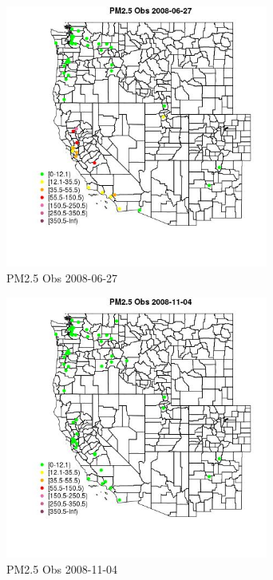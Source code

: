 \begin{figure} 
\centering  
\includegraphics[width=0.77\textwidth]{Code_Outputs/Report_ML_input_PM25_Step4_part_e_de_duplicated_aves_MapObsPM25_Obs2008-06-27.jpg} 
\caption{\label{fig:Report_ML_input_PM25_Step4_part_e_de_duplicated_avesMapObsPM25_Obs2008-06-27}PM2.5 Obs 2008-06-27} 
\end{figure} 
 

\begin{figure} 
\centering  
\includegraphics[width=0.77\textwidth]{Code_Outputs/Report_ML_input_PM25_Step4_part_e_de_duplicated_aves_MapObsPM25_Obs2008-11-04.jpg} 
\caption{\label{fig:Report_ML_input_PM25_Step4_part_e_de_duplicated_avesMapObsPM25_Obs2008-11-04}PM2.5 Obs 2008-11-04} 
\end{figure} 
 

